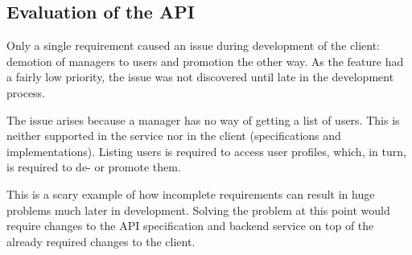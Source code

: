 \subsection{Evaluation of the API}
\label{sec:evalapi}

Only a single requirement caused an issue during development of the client:
demotion of managers to users and promotion the other way. As the feature
had a fairly low priority, the issue was not discovered until late in the
development process.

The issue arises because a manager has no way of getting a list of users. This
is neither supported in the service nor in the client (specifications and
implementations). Listing users is required to access user profiles, which, in
turn, is required to de- or promote them.

This is a scary example of how incomplete requirements can result in huge problems much
later in development. Solving the problem at this point would require changes to
the API specification and backend service on top of the already required changes
to the client.
